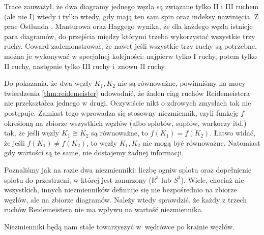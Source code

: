Trace \cite{trace1983} zauważył, że dwa diagramy jednego węzła są związane tylko II i III ruchem (ale nie I) wtedy i tylko wtedy, gdy mają ten sam spin oraz indeksy nawinięcia.
%
Z prac Östlunda \cite{ostlund2001}, Manturowa \cite[s. ???]{manturov2004} oraz Haggego \cite{hagge2006} wynika, że dla każdego węzła istnieje para diagramów, do przejścia między którymi trzeba wykorzystać wszystkie trzy ruchy.
%
%
%
Coward \cite{coward2006} zademonstrował, że nawet jeśli wszystkie trzy ruchy są potrzebne, można je wykonywać w specjalnej kolejności: najpierw tylko I ruchy, potem tylko II ruchy, następnie tylko III ruchy i~znowu II ruchy.
%

Do pokazania, że dwa węzły $K_1, K_2$ nie są równoważne, powinniśmy na mocy twierdzenia \ref{thm:reidemeister} udowodnić, że żaden ciąg ruchów Reidemeistera nie przekształca jednego w drugi.
Oczywiście nikt o zdrowych zmysłach tak nie postępuje.
Zamiast tego wprowadza się stosowny niezmiennik, czyli funkcję $f$ określoną na zbiorze wszystkich węzłów (albo splotów, supłów, warkoczy itd.) tak, że jeśli węzły $K_1 \cong K_2$ są równoważne, to $f(K_1) = f(K_2)$.
Łatwo widać, że jeśli $f(K_1) \neq f(K_2)$, to węzły $K_1, K_2$ nie mogą być równoważne.
Natomiast gdy wartości są te same, nie dostajemy żadnej informacji.

Poznaliśmy jak na razie dwa niezmienniki: liczbę ogniw splotu oraz dopełnienie splotu do przestrzeni, w której jest zanurzony ($\mathbb R^3$ lub $S^3$).
Wiele, chociaż nie wszystkich, innych niezmienników definiuje się nie bezpośrednio na zbiorze węzłów, ale na zbiorze diagramów.
Należy wtedy sprawdzić, że każdy z trzech ruchów Reidemeistera nie ma wpływu na wartość niezmiennika.

Niezmienniki będą nam stale towarzyszyć w~wędrówce po krainie węzłów.

